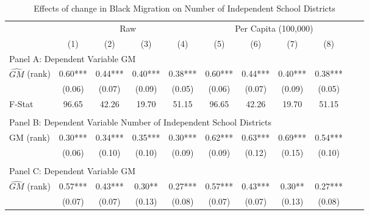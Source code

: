  \begin{table}[htbp]\centering {} \begin{threeparttable} \caption{Effects of change in Black Migration on Number of Independent School Districts} \begin{tabular}{l*{10}{c}} \toprule
                &\multicolumn{4}{c}{Raw}                                    &\multicolumn{4}{c}{Per Capita (100,000)}                   \\\cmidrule(lr){2-5}\cmidrule(lr){6-9}
                &\multicolumn{1}{c}{(1)}   &\multicolumn{1}{c}{(2)}   &\multicolumn{1}{c}{(3)}   &\multicolumn{1}{c}{(4)}   &\multicolumn{1}{c}{(5)}   &\multicolumn{1}{c}{(6)}   &\multicolumn{1}{c}{(7)}   &\multicolumn{1}{c}{(8)}   \\
\cmidrule(lr){1-9}
\multicolumn{8}{l}{Panel A: Dependent Variable GM}\\
\cmidrule(lr){1-9}
$\hat{GM}$ (rank)&       0.60***&       0.44***&       0.40***&       0.38***&       0.60***&       0.44***&       0.40***&       0.38***\\
                &     (0.06)   &     (0.07)   &     (0.09)   &     (0.05)   &     (0.06)   &     (0.07)   &     (0.09)   &     (0.05)   \\
\midrule
F-Stat          &      96.65   &      42.26   &      19.70   &      51.15   &      96.65   &      42.26   &      19.70   &      51.15   \\
\cmidrule[\heavyrulewidth](lr){1-9} \\ \cmidrule[\heavyrulewidth](lr){1-9}
\multicolumn{8}{l}{Panel B: Dependent Variable Number of Independent School Districts}\\
\cmidrule(lr){1-9}
GM  (rank)      &       0.30***&       0.34***&       0.35***&       0.30***&       0.62***&       0.63***&       0.69***&       0.54***\\
                &     (0.06)   &     (0.10)   &     (0.10)   &     (0.09)   &     (0.09)   &     (0.12)   &     (0.15)   &     (0.10)   \\
\cmidrule[\heavyrulewidth](lr){1-9} \\ \cmidrule[\heavyrulewidth](lr){1-9}
\multicolumn{8}{l}{Panel C: Dependent Variable GM}\\
\cmidrule(lr){1-9}
$\hat{GM}$ (rank)&       0.57***&       0.43***&       0.30** &       0.27***&       0.57***&       0.43***&       0.30** &       0.27***\\
                &     (0.07)   &     (0.07)   &     (0.13)   &     (0.08)   &     (0.07)   &     (0.07)   &     (0.13)   &     (0.08)   \\

\end{tabular}
\end{threeparttable}
\end{table}
